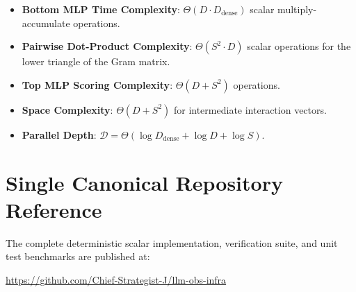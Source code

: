 \documentclass[11pt,a4paper]{article}
\theoremstyle{definition}
\begin{document}
\begin{itemize}
    \item \textbf{Bottom MLP Time Complexity}: $\Theta(D \cdot D_{\text{dense}})$ scalar multiply-accumulate operations.
    \item \textbf{Pairwise Dot-Product Complexity}: $\Theta(S^2 \cdot D)$ scalar operations for the lower triangle of the Gram matrix.
    \item \textbf{Top MLP Scoring Complexity}: $\Theta(D + S^2)$ operations.
    \item \textbf{Space Complexity}: $\Theta(D + S^2)$ for intermediate interaction vectors.
    \item \textbf{Parallel Depth}: $\mathcal{D} = \Theta(\log D_{\text{dense}} + \log D + \log S)$.
\end{itemize}

\section{Single Canonical Repository Reference}

The complete deterministic scalar implementation, verification suite, and unit test benchmarks are published at:
\begin{center}
\url{https://github.com/Chief-Strategist-J/llm-obs-infra}
\end{center}
\end{document}
